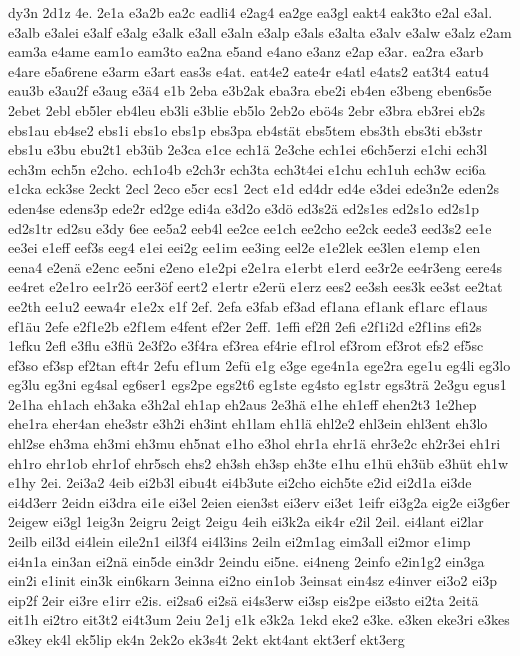 {dy3n
2d1z
4e.
2e1a
e3a2b
ea2c
eadli4
e2ag4
ea2ge
ea3gl
eakt4
eak3to
e2al
e3al.
e3alb
e3alei
e3alf
e3alg
e3alk
e3all
e3aln
e3alp
e3als
e3alta
e3alv
e3alw
e3alz
e2am
eam3a
e4ame
eam1o
eam3to
ea2na
e5and
e4ano
e3anz
e2ap
e3ar.
ea2ra
e3arb
e4are
e5a6rene
e3arm
e3art
eas3s
e4at.
eat4e2
eate4r
e4atl
e4ats2
eat3t4
eatu4
eau3b
e3au2f
e3aug
e3ä4
e1b
2eba
e3b2ak
eba3ra
ebe2i
eb4en
e3beng
eben6s5e
2ebet
2ebl
eb5ler
eb4leu
eb3li
e3blie
eb5lo
2eb2o
ebö4s
2ebr
e3bra
eb3rei
eb2s
ebs1au
eb4se2
ebs1i
ebs1o
ebs1p
ebs3pa
eb4stät
ebs5tem
ebs3th
ebs3ti
eb3str
ebs1u
e3bu
ebu2t1
eb3üb
2e3ca
e1ce
ech1ä
2e3che
ech1ei
e6ch5erzi
e1chi
ech3l
ech3m
ech5n
e2cho.
ech1o4b
e2ch3r
ech3ta
ech3t4ei
e1chu
ech1uh
ech3w
eci6a
e1cka
eck3se
2eckt
2ecl
2eco
e5cr
ecs1
2ect
e1d
ed4dr
ed4e
e3dei
ede3n2e
eden2s
eden4se
edens3p
ede2r
ed2ge
edi4a
e3d2o
e3dö
ed3s2ä
ed2s1es
ed2s1o
ed2s1p
ed2s1tr
ed2su
e3dy
6ee
ee5a2
eeb4l
ee2ce
ee1ch
ee2cho
ee2ck
eede3
eed3s2
ee1e
ee3ei
e1eff
eef3s
eeg4
e1ei
eei2g
ee1im
ee3ing
eel2e
e1e2lek
ee3len
e1emp
e1en
eena4
e2enä
e2enc
ee5ni
e2eno
e1e2pi
e2e1ra
e1erbt
e1erd
ee3r2e
ee4r3eng
eere4s
ee4ret
e2e1ro
ee1r2ö
eer3öf
eert2
e1ertr
e2erü
e1erz
ees2
ee3sh
ees3k
ee3st
ee2tat
ee2th
ee1u2
eewa4r
e1e2x
e1f
2ef.
2efa
e3fab
ef3ad
ef1ana
ef1ank
ef1arc
ef1aus
ef1äu
2efe
e2f1e2b
e2f1em
e4fent
ef2er
2eff.
1effi
ef2fl
2efi
e2f1i2d
e2f1ins
efi2s
1efku
2efl
e3flu
e3flü
2e3f2o
e3f4ra
ef3rea
ef4rie
ef1rol
ef3rom
ef3rot
efs2
ef5sc
ef3so
ef3sp
ef2tan
eft4r
2efu
ef1um
2efü
e1g
e3ge
ege4n1a
ege2ra
ege1u
eg4li
eg3lo
eg3lu
eg3ni
eg4sal
eg6ser1
egs2pe
egs2t6
eg1ste
eg4sto
eg1str
egs3trä
2e3gu
egus1
2e1ha
eh1ach
eh3aka
e3h2al
eh1ap
eh2aus
2e3hä
e1he
eh1eff
ehen2t3
1e2hep
ehe1ra
eher4an
ehe3str
e3h2i
eh3int
eh1lam
eh1lä
ehl2e2
ehl3ein
ehl3ent
eh3lo
ehl2se
eh3ma
eh3mi
eh3mu
eh5nat
e1ho
e3hol
ehr1a
ehr1ä
ehr3e2c
eh2r3ei
eh1ri
eh1ro
ehr1ob
ehr1of
ehr5sch
ehs2
eh3sh
eh3sp
eh3te
e1hu
e1hü
eh3üb
e3hüt
eh1w
e1hy
2ei.
2ei3a2
4eib
ei2b3l
eibu4t
ei4b3ute
ei2cho
eich5te
e2id
ei2d1a
ei3de
ei4d3err
2eidn
ei3dra
ei1e
ei3el
2eien
eien3st
ei3erv
ei3et
1eifr
ei3g2a
eig2e
ei3g6er
2eigew
ei3gl
1eig3n
2eigru
2eigt
2eigu
4eih
ei3k2a
eik4r
e2il
2eil.
ei4lant
ei2lar
2eilb
eil3d
ei4lein
eile2n1
eil3f4
ei4l3ins
2eiln
ei2m1ag
eim3all
ei2mor
e1imp
ei4n1a
ein3an
ei2nä
ein5de
ein3dr
2eindu
ei5ne.
ei4neng
2einfo
e2in1g2
ein3ga
ein2i
e1init
ein3k
ein6karn
3einna
ei2no
ein1ob
3einsat
ein4sz
e4inver
ei3o2
ei3p
eip2f
2eir
ei3re
e1irr
e2is.
ei2sa6
ei2sä
ei4s3erw
ei3sp
eis2pe
ei3sto
ei2ta
2eitä
eit1h
ei2tro
eit3t2
ei4t3um
2eiu
2e1j
e1k
e3k2a
1ekd
eke2
e3ke.
e3ken
eke3ri
e3kes
e3key
ek4l
ek5lip
ek4n
2ek2o
ek3s4t
2ekt
ekt4ant
ekt3erf
ekt3erg
}
